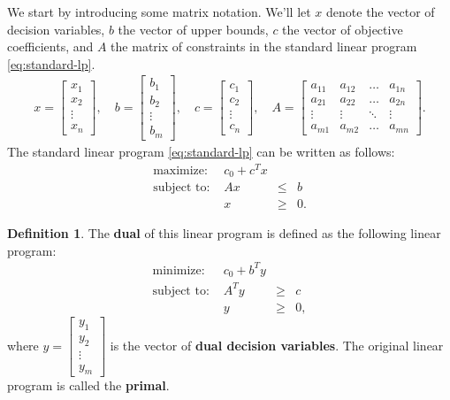 \documentclass[
]{book}
\theoremstyle{definition}
\newtheorem{definition}{Definition}[chapter]
\theoremstyle{definition}
\theoremstyle{definition}
\theoremstyle{definition}
\theoremstyle{remark}
\begin{document}
We start by introducing some matrix notation. We'll let \(x\) denote the vector of decision variables, \(b\) the vector of upper bounds, \(c\) the vector of objective coefficients, and \(A\) the matrix of constraints in the standard linear program \eqref{eq:standard-lp}.
\begin{align*}
  x = \begin{bmatrix} x_1 \\ x_2 \\ \vdots \\ x_n \end{bmatrix}, \quad
  b = \begin{bmatrix} b_1 \\ b_2 \\ \vdots \\ b_m \end{bmatrix}, \quad
  c = \begin{bmatrix} c_1 \\ c_2 \\ \vdots \\ c_n \end{bmatrix}, \quad
  A = \begin{bmatrix} a_{11} & a_{12} & \dots & a_{1n} \\
            a_{21} & a_{22} & \dots & a_{2n} \\
            \vdots & \vdots & \ddots & \vdots \\
            a_{m1} & a_{m2} & \dots & a_{mn} \end{bmatrix}.
\end{align*}
The standard linear program \eqref{eq:standard-lp} can be written as follows:
\begin{equation*}
\begin{array}{lrll}
  \mbox{maximize: } & c_0 + c^T x \\
  \mbox{subject to: } 
    & A x & \leq & b \\
    & x & \geq & 0.
\end{array}
\end{equation*}

\begin{definition}
The \textbf{dual} of this linear program is defined as the following linear program:
\begin{equation}
  \begin{array}{lrll}
    \mbox{minimize: } & c_0 + b^T y \\
    \mbox{subject to: } 
      & A^T y & \geq & c \\
      & y & \geq & 0,
  \end{array}
  \label{eq:standard-dual-lp}
\end{equation}
where \(y = \begin{bmatrix} y_1 \\ y_2 \\ \vdots \\ y_m \end{bmatrix}\) is the vector of \textbf{dual
decision variables}. The original linear program is called the \textbf{primal}.
\end{definition}
\end{document}

